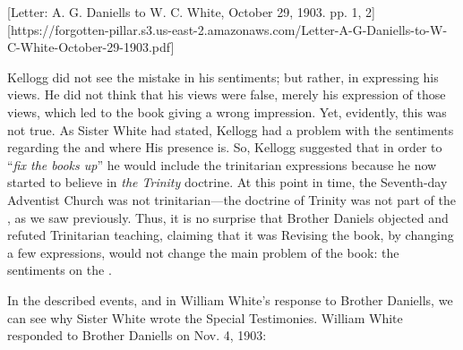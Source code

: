 

[Letter: A. G. Daniells to W. C. White, October 29, 1903. pp. 1, 2][https://forgotten-pillar.s3.us-east-2.amazonaws.com/Letter-A-G-Daniells-to-W-C-White-October-29-1903.pdf]

Kellogg did not see the mistake in his sentiments; but rather, in expressing his views. He did not think that his views were false, merely his expression of those views, which led to the book giving a wrong impression. Yet, evidently, this was not true. As Sister White had stated, Kellogg had a problem with the sentiments regarding the  and where His presence is. So, Kellogg suggested that in order to “\textit{fix the books up}” he would include the trinitarian expressions because he now started to believe in \textit{the Trinity} doctrine. At this point in time, the Seventh-day Adventist Church was not trinitarian—the doctrine of Trinity was not part of the , as we saw previously. Thus, it is no surprise that Brother Daniels objected and refuted Trinitarian teaching, claiming that it was Revising the book, by changing a few expressions, would not change the main problem of the book: the sentiments on the . 

In the described events, and in William White's response to Brother Daniells, we can see why Sister White wrote the Special Testimonies. William White responded to Brother Daniells on Nov. 4, 1903:

